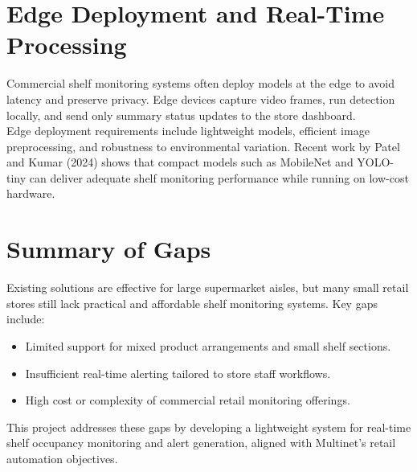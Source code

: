 \section{Edge Deployment and Real-Time Processing}

Commercial shelf monitoring systems often deploy models at the edge to avoid latency and preserve privacy. Edge devices capture video frames, run detection locally, and send only summary status updates to the store dashboard.
\\
Edge deployment requirements include lightweight models, efficient image preprocessing, and robustness to environmental variation. Recent work by Patel and Kumar (2024) shows that compact models such as MobileNet and YOLO-tiny can deliver adequate shelf monitoring performance while running on low-cost hardware.

\section{Summary of Gaps}

Existing solutions are effective for large supermarket aisles, but many small retail stores still lack practical and affordable shelf monitoring systems. Key gaps include:
\begin{itemize}
    \item Limited support for mixed product arrangements and small shelf sections.
    \item Insufficient real-time alerting tailored to store staff workflows.
    \item High cost or complexity of commercial retail monitoring offerings.
\end{itemize}

This project addresses these gaps by developing a lightweight system for real-time shelf occupancy monitoring and alert generation, aligned with Multinet's retail automation objectives.
